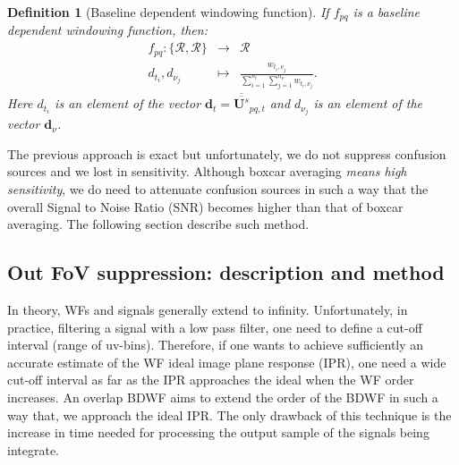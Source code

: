 \documentclass[useAMS,usenatbib]{mn2e}
\newtheorem{definition}[theorem]{Definition}
\begin{document}
\begin{definition}[Baseline dependent windowing function]
\label{def:3}
If $f_{pq}$ is a \textit{baseline dependent windowing function}, then:
\begin{eqnarray*}
 f_{pq}: \{\mathbf{\mathcal{R}},\mathbf{\mathcal{R}}\} &\rightarrow& \mathbf{\mathcal{R}}\\
                   d_{t_i},d_{\nu_j} &\mapsto& \frac{w_{t_i,\nu_j}}{\sum_{i=1}^{n_t}\sum_{j=1}^{n_{\nu}}w_{t_i,\nu_j}}.
\end{eqnarray*}
Here $d_{t_i}$ is an element of the vector $\mathbf{d}_{t}=\overline{\overline{\mathbf{U}^{s}}}_{pq,t}$ and $d_{\nu_j}$ is an element 
of the vector $\mathbf{d}^{}_{\nu}$.
\end{definition}
The previous approach is exact but unfortunately, we do not suppress confusion sources and we lost in 
sensitivity. Although boxcar averaging \textit{means high sensitivity}, we do need to attenuate confusion sources in such a 
way that the overall Signal to Noise Ratio (SNR) becomes higher than that of boxcar averaging. The following section describe such 
method.
\subsection{Out FoV suppression: description and method}
\label{baseline2}
In theory, WFs and signals generally extend to  infinity. Unfortunately, in practice, filtering a signal with a low pass 
filter, one need to define a cut-off interval (range of uv-bins). Therefore, if one  wants to achieve sufficiently an accurate  estimate 
of the WF ideal image plane response (IPR), one need a wide cut-off interval as far as the IPR approaches 
the ideal when the WF order increases. An overlap BDWF aims to extend the order of the BDWF in 
such a way that, we approach the ideal IPR. The only drawback of this technique is the increase in time needed for processing the 
output sample of the signals being integrate.
\end{document}
